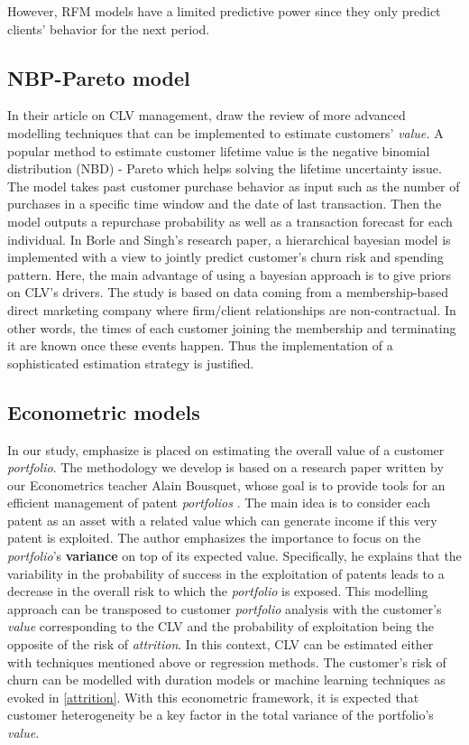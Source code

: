 \documentclass[
]{book}
\begin{document}
However, RFM models have a limited predictive power since they only predict clients' behavior for the next period.

\hypertarget{nbp-pareto-model}{%
\subsection{NBP-Pareto model}\label{nbp-pareto-model}}

In their article on CLV management, \citet{CLV_MEASUREMENT} draw the review of more advanced modelling techniques that can be implemented to estimate customers' \emph{value.} A popular method to estimate customer lifetime value is the negative binomial distribution (NBD) - Pareto \citep{CLV_NBD} which helps solving the lifetime uncertainty issue. The model takes past customer purchase behavior as input such as the number of purchases in a specific time window and the date of last transaction. Then the model outputs a repurchase probability as well as a transaction forecast for each individual. In Borle and Singh's research paper, a hierarchical bayesian model is implemented with a view to jointly predict customer's churn risk and spending pattern. Here, the main advantage of using a bayesian approach is to give priors on CLV's drivers. The study is based on data coming from a membership-based direct marketing company where firm/client relationships are non-contractual. In other words, the times of each customer joining the membership and terminating it are known once these events happen. Thus the implementation of a sophisticated estimation strategy is justified.

\hypertarget{econometric-models}{%
\subsection{Econometric models}\label{econometric-models}}

In our study, emphasize is placed on estimating the overall value of a customer \emph{portfolio}. The methodology we develop is based on a research paper written by our Econometrics teacher Alain Bousquet, whose goal is to provide tools for an efficient management of patent \emph{portfolios} \citep{BREVETS}. The main idea is to consider each patent as an asset with a related value which can generate income if this very patent is exploited. The author emphasizes the importance to focus on the \emph{portfolio}'s \textbf{variance} on top of its expected value. Specifically, he explains that the variability in the probability of success in the exploitation of patents leads to a decrease in the overall risk to which the \emph{portfolio} is exposed. This modelling approach can be transposed to customer \emph{portfolio} analysis with the customer's \emph{value} corresponding to the CLV and the probability of exploitation being the opposite of the risk of \emph{attrition}. In this context, CLV can be estimated either with techniques mentioned above or regression methods. The customer's risk of churn can be modelled with duration models or machine learning techniques as evoked in \ref{attrition}. With this econometric framework, it is expected that customer heterogeneity be a key factor in the total variance of the portfolio's \emph{value}.
\end{document}
